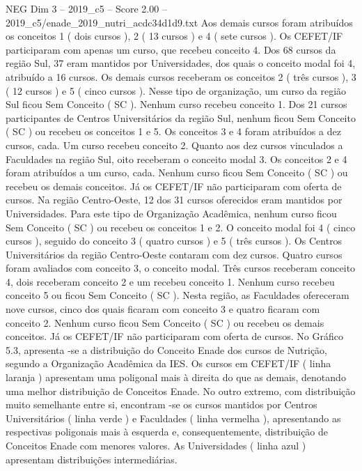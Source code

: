 \begin{textsample}{NEG Dim 3 – 2019\_c5 – Score 2.00 – 2019\_c5/enade\_2019\_nutri\_acdc34d1d9.txt}
Aos demais cursos foram atribuídos os conceitos 1 ( dois cursos ), 2 ( 13 cursos ) e 4 ( sete cursos ).
Os CEFET/IF participaram com apenas um curso, que recebeu conceito 4.
Dos 68 cursos da região Sul, 37 eram mantidos por Universidades, dos quais o conceito modal foi 4, atribuído a 16 cursos.
Os demais cursos receberam os conceitos 2 ( três cursos ), 3 ( 12 cursos ) e 5 ( cinco cursos ).
Nesse tipo de organização, um curso da região Sul ficou Sem Conceito ( SC ).
Nenhum curso recebeu conceito 1.
Dos 21 cursos participantes de Centros Universitários da região Sul, nenhum ficou Sem Conceito ( SC ) ou recebeu os conceitos 1 e 5.
Os conceitos 3 e 4 foram atribuídos a dez cursos, cada.
Um curso recebeu conceito 2.
Quanto aos dez cursos vinculados a Faculdades na região Sul, oito receberam o conceito modal 3.
Os conceitos 2 e 4 foram atribuídos a um curso, cada.
Nenhum curso ficou Sem Conceito ( SC ) ou recebeu os demais conceitos.
Já os CEFET/IF não participaram com oferta de cursos.
Na região Centro-Oeste, 12 dos 31 cursos oferecidos eram mantidos por Universidades.
Para este tipo de Organização Acadêmica, nenhum curso ficou Sem Conceito ( SC ) ou recebeu os conceitos 1 e 2.
O conceito modal foi 4 ( cinco cursos ), seguido do conceito 3 ( quatro cursos ) e 5 ( três cursos ).
Os Centros Universitários da região Centro-Oeste contaram com dez cursos.
Quatro cursos foram avaliados com conceito 3, o conceito modal.
Três cursos receberam conceito 4, dois receberam conceito 2 e um recebeu conceito 1.
Nenhum curso recebeu conceito 5 ou ficou Sem Conceito ( SC ).
Nesta região, as Faculdades ofereceram nove cursos, cinco dos quais ficaram com conceito 3 e quatro ficaram com conceito 2.
Nenhum curso ficou Sem Conceito ( SC ) ou recebeu os demais conceitos.
Já os CEFET/IF não participaram com oferta de cursos.
No Gráfico 5.3, apresenta -se a distribuição do Conceito Enade dos cursos de Nutrição, segundo a Organização Acadêmica da IES.
Os cursos em CEFET/IF ( linha laranja ) apresentam uma poligonal mais à direita do que as demais, denotando uma melhor distribuição de Conceitos Enade.
No outro extremo, com distribuição muito semelhante entre si, encontram -se os cursos mantidos por Centros Universitários ( linha verde ) e Faculdades ( linha vermelha ), apresentando as respectivas poligonais mais à esquerda e, consequentemente, distribuição de Conceitos Enade com menores valores.
As Universidades ( linha azul ) apresentam distribuições intermediárias.

\end{textsample}
